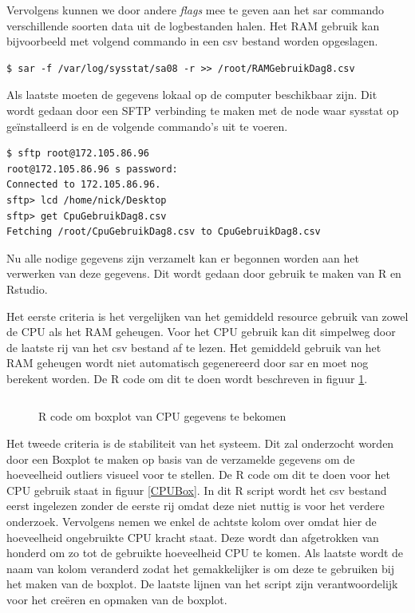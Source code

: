 Vervolgens kunnen we door andere \textit{flags} mee te geven aan het sar commando verschillende soorten data uit de logbestanden halen. Het RAM gebruik kan bijvoorbeeld met volgend commando in een csv bestand worden opgeslagen.

\begin{verbatim} 
$ sar -f /var/log/sysstat/sa08 -r >> /root/RAMGebruikDag8.csv
\end{verbatim}

Als laatste moeten de gegevens lokaal op de computer beschikbaar zijn. Dit wordt gedaan door een SFTP verbinding te maken met de node waar sysstat op geïnstalleerd is en de volgende commando's uit te voeren. 

\begin{verbatim} 
$ sftp root@172.105.86.96
root@172.105.86.96 s password:
Connected to 172.105.86.96.
sftp> lcd /home/nick/Desktop
sftp> get CpuGebruikDag8.csv
Fetching /root/CpuGebruikDag8.csv to CpuGebruikDag8.csv
\end{verbatim}

Nu alle nodige gegevens zijn verzamelt kan er begonnen worden aan het verwerken van deze gegevens. Dit wordt gedaan door gebruik te maken van R en Rstudio. 

Het eerste criteria is het vergelijken van het gemiddeld resource gebruik van zowel de CPU als het RAM geheugen. Voor het CPU gebruik kan dit simpelweg door de laatste rij van het csv bestand af te lezen. Het gemiddeld gebruik van het RAM geheugen wordt niet automatisch gegenereerd door sar en moet nog berekent worden. De R code om dit te doen wordt beschreven in figuur \ref{RAMAVG}.

\begin{figure}[h] 
	\inputminted[fontsize=\footnotesize,linenos]{R}{files/dataRAMAVG.R}
	\caption{R code om boxplot van CPU gegevens te bekomen}
	\label{RAMAVG}
\end{figure}
%

Het tweede criteria is de stabiliteit van het systeem. Dit zal onderzocht worden door een Boxplot te maken op basis van de verzamelde gegevens om de hoeveelheid outliers visueel voor te stellen. De R code om dit te doen voor het CPU gebruik staat in figuur \ref{CPUBox}. In dit R script wordt het csv bestand eerst ingelezen zonder de eerste rij omdat deze niet nuttig is voor het verdere onderzoek. Vervolgens nemen we enkel de achtste kolom over omdat hier de hoeveelheid ongebruikte CPU kracht staat. Deze wordt dan afgetrokken van honderd om zo tot de gebruikte hoeveelheid CPU te komen. Als laatste wordt de naam van kolom veranderd zodat het gemakkelijker is om deze te gebruiken bij het maken van de boxplot. De laatste lijnen van het script zijn verantwoordelijk voor het creëren en opmaken van de boxplot.

